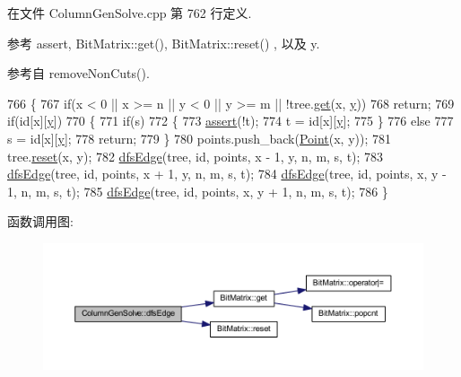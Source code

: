 在文件 Column\+Gen\+Solve.\+cpp 第 762 行定义.



参考 assert, Bit\+Matrix\+::get(), Bit\+Matrix\+::reset() , 以及 y.



参考自 remove\+Non\+Cuts().


\begin{DoxyCode}
766 \{
767     \textcolor{keywordflow}{if}(x < 0 || x >= n || y < 0 || y >= m || !tree.\hyperlink{classBitMatrix_ad19d1045b54ccc8a99d70d38305b4ca6}{get}(x, \hyperlink{classes_8txt_a52673b1e0cce0104e52dcd12727f211e}{y}))
768         \textcolor{keywordflow}{return};
769     \textcolor{keywordflow}{if}(\textcolor{keywordtype}{id}[x][\hyperlink{classes_8txt_a52673b1e0cce0104e52dcd12727f211e}{y}])
770     \{
771         \textcolor{keywordflow}{if}(s)
772         \{
773             \hyperlink{global_8h_af576bf8ffa22a44e53018c67095ffbf0}{assert}(!t);
774             t = \textcolor{keywordtype}{id}[x][\hyperlink{classes_8txt_a52673b1e0cce0104e52dcd12727f211e}{y}];
775         \}
776         \textcolor{keywordflow}{else}
777             s = \textcolor{keywordtype}{id}[x][\hyperlink{classes_8txt_a52673b1e0cce0104e52dcd12727f211e}{y}];
778         \textcolor{keywordflow}{return};
779     \}
780     points.push\_back(\hyperlink{classPoint}{Point}(x, y));
781     tree.\hyperlink{classBitMatrix_a0ee870454e6343c3272ab791e45af404}{reset}(x, y);
782     \hyperlink{classColumnGenSolve_a96cbeba5fb978bb67e32b8f42ba161fe}{dfsEdge}(tree, \textcolor{keywordtype}{id}, points, x - 1, y, n, m, s, t);
783     \hyperlink{classColumnGenSolve_a96cbeba5fb978bb67e32b8f42ba161fe}{dfsEdge}(tree, \textcolor{keywordtype}{id}, points, x + 1, y, n, m, s, t);
784     \hyperlink{classColumnGenSolve_a96cbeba5fb978bb67e32b8f42ba161fe}{dfsEdge}(tree, \textcolor{keywordtype}{id}, points, x, y - 1, n, m, s, t);
785     \hyperlink{classColumnGenSolve_a96cbeba5fb978bb67e32b8f42ba161fe}{dfsEdge}(tree, \textcolor{keywordtype}{id}, points, x, y + 1, n, m, s, t);
786 \}
\end{DoxyCode}


函数调用图\+:
\nopagebreak
\begin{figure}[H]
\begin{center}
\leavevmode
\includegraphics[width=350pt]{classColumnGenSolve_a96cbeba5fb978bb67e32b8f42ba161fe_cgraph}
\end{center}
\end{figure}




